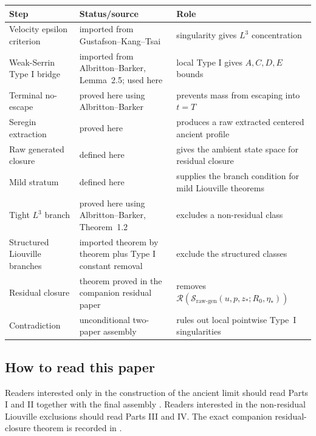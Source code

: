 \documentclass[11pt]{amsart}
\theoremstyle{plain}
\theoremstyle{definition}
\theoremstyle{remark}
\numberwithin{equation}{section}
\newcommand{\calS}{\mathcal S}
\newcommand{\calR}{\mathcal R}
\begin{document}
\begin{center}
\small
\setlength{\tabcolsep}{4pt}
\begin{tabular}{@{}>{\raggedright\arraybackslash}p{}
                >{\raggedright\arraybackslash}p{}
                >{\raggedright\arraybackslash}p{}@{}}
\hline
Step & Status/source & Role \\
\hline
Velocity epsilon criterion & imported from Gustafson--Kang--Tsai & singularity gives \(L^3\) concentration \\
Weak-Serrin Type I bridge & imported from Albritton--Barker, Lemma~2.5; used here & local Type I gives \(A,C,D,E\) bounds \\
Terminal no-escape & proved here using Albritton--Barker & prevents mass from escaping into \(t=T\) \\
Seregin extraction & proved here & produces a raw extracted centered ancient profile \\
Raw generated closure & defined here & gives the ambient state space for residual closure \\
Mild stratum & defined here & supplies the branch condition for mild Liouville theorems \\
Tight \(L^3\) branch & proved here using Albritton--Barker, Theorem~1.2 & excludes a non-residual class \\
Structured Liouville branches & imported theorem by theorem plus Type I constant removal & exclude the structured classes \\
Residual closure & theorem proved in the companion residual paper & removes \(\calR(\calS_{\mathrm{raw\text{-}gen}}(u,p,z_*;R_0,\eta_*))\) \\
Contradiction & unconditional two-paper assembly & rules out local pointwise Type~I singularities \\
\hline
\end{tabular}
\end{center}

\subsection*{How to read this paper}

Readers interested only in the construction of the ancient limit should read
Parts I and II together with the final assembly
.  Readers interested in the non-residual
Liouville exclusions should read Parts III and IV.  The exact companion
residual-closure theorem is recorded in .
\end{document}

